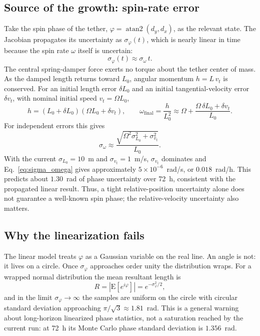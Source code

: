 \documentclass{article}
\begin{document}
\subsection{Source of the growth: spin-rate error}

Take the spin phase of the tether, $\varphi = \operatorname{atan2}(d_y, d_x)$,
as the relevant state. The Jacobian propagates its uncertainty as
$\sigma_\varphi(t)$, which is nearly linear in time because the spin rate
$\omega$ itself is uncertain:
\begin{equation}
  \sigma_\varphi(t) \approx \sigma_\omega\, t .
\end{equation}
The central spring-damper force exerts no torque about the tether center of
mass. As the damped length returns toward $L_0$, angular momentum
$h=L\,v_t$ is conserved. For an initial length error $\delta L_0$ and an
initial tangential-velocity error $\delta v_t$, with nominal initial speed
$v_t=\Omega L_0$,
\begin{equation}
  h = (L_0+\delta L_0)(\Omega L_0+\delta v_t),\qquad
  \omega_{\mathrm{final}} = \frac{h}{L_0^2}
  \approx \Omega+\frac{\Omega\,\delta L_0+\delta v_t}{L_0}.
\end{equation}
For independent errors this gives
\begin{equation}
  \sigma_\omega \approx
  \frac{\sqrt{\Omega^2\sigma_{L_0}^2+\sigma_{v_t}^2}}{L_0}.
  \label{eq:sigma_omega}
\end{equation}
With the current $\sigma_{L_0}=10$~m and $\sigma_{v_t}=1$~m/s,
$\sigma_{v_t}$ dominates and Eq.~\eqref{eq:sigma_omega} gives approximately
$5\times10^{-6}$~rad/s, or $0.018$~rad/h. This predicts about $1.30$~rad of
phase uncertainty over 72~h, consistent with the propagated linear result.
Thus, a tight relative-position uncertainty alone does not guarantee a
well-known spin phase; the relative-velocity uncertainty also matters.

\subsection{Why the linearization fails}

The linear model treats $\varphi$ as a Gaussian variable on the real line. An
angle is not: it lives on a circle. Once $\sigma_\varphi$ approaches order
unity the distribution wraps. For a wrapped normal distribution the mean
resultant length is
\begin{equation}
  R = \left\lvert \mathrm{E}\!\left[e^{i\varphi}\right]\right\rvert
    = e^{-\sigma_\varphi^{2}/2},
\end{equation}
and in the limit $\sigma_\varphi\to\infty$ the samples are uniform on the
circle with circular standard deviation approaching $\pi/\sqrt{3}
\approx1.81$~rad. This is a general warning about long-horizon linearized
phase statistics, not a saturation reached by the current run: at 72~h its
Monte Carlo phase standard deviation is $1.356$~rad.
\end{document}

